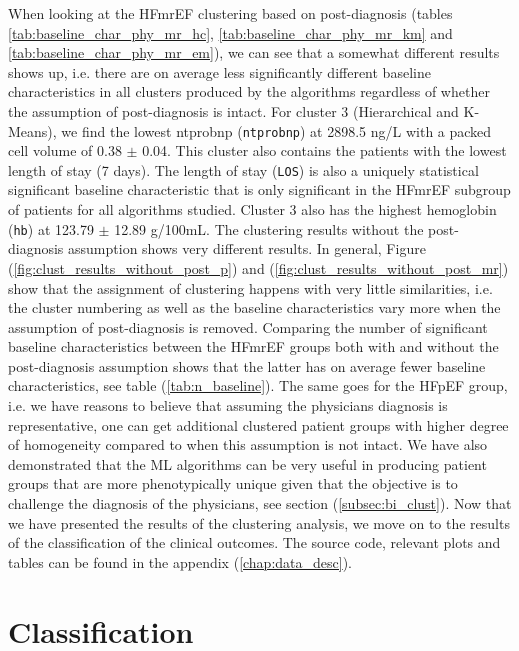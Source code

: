 \documentclass[../thesis.tex]{subfiles}
\begin{document}
\indent When looking at the HFmrEF clustering based on post-diagnosis (tables \ref{tab:baseline_char_phy_mr_hc}, \ref{tab:baseline_char_phy_mr_km} and \ref{tab:baseline_char_phy_mr_em}), we can see that a somewhat different results shows up, i.e. there are on average less significantly different baseline characteristics in all clusters produced by the algorithms regardless of whether the assumption of post-diagnosis is intact. For cluster 3 (Hierarchical and K-Means), we find the lowest ntprobnp (\texttt{ntprobnp}) at 2898.5 ng/L with a packed cell volume of 0.38 $\pm$ 0.04. This cluster also contains the patients with the lowest length of stay (7 days). The length of stay (\texttt{LOS}) is also a uniquely statistical significant baseline characteristic that is only significant in the HFmrEF subgroup of patients for all algorithms studied. Cluster 3 also has the highest hemoglobin (\texttt{hb}) at 123.79 $\pm$ 12.89 g/100mL. The clustering results without the post-diagnosis assumption shows very different results. In general, Figure (\ref{fig:clust_results_without_post_p}) and (\ref{fig:clust_results_without_post_mr}) show that the assignment of clustering happens with very little similarities, i.e. the cluster numbering as well as the baseline characteristics vary more when the assumption of post-diagnosis is removed. Comparing the number of significant baseline characteristics between the HFmrEF groups both with and without the post-diagnosis assumption shows that the latter has on average fewer baseline characteristics, see table (\ref{tab:n_baseline}). The same goes for the HFpEF group, i.e. we have reasons to believe that assuming the physicians diagnosis is representative, one can get additional clustered patient groups with higher degree of homogeneity compared to when this assumption is not intact. We have also demonstrated that the ML algorithms can be very useful in producing patient groups that are more phenotypically unique given that the objective is to challenge the diagnosis of the physicians, see section (\ref{subsec:bi_clust}). Now that we have presented the results of the clustering analysis, we move on to the results of the classification of the clinical outcomes. The source code, relevant plots and tables can be found in the appendix (\ref{chap:data_desc}).

\vspace*{-0,5cm}\section{Classification}
\end{document}
